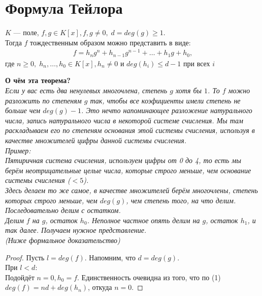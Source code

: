 \section{Формула Тейлора}

\begin{normalsize}

    \begin{theorem-non}
        $K$ --- поле, $f,g \in K[x], f,g \neq 0,\; d = deg(g) \geqslant 1.$ \\
        Тогда $f$ тождественным образом можно представить в виде:
        \begin{align}
            f = h_ng^n + h_{n-1}g^{n-1} + \dots + h_1g + h_0,
        \end{align}
        где $n \geqslant 0,\; h_n, \dots, h_0 \in K[x], h_n \neq 0$ и $deg(h_i) \leqslant d - 1$ при всех $i$
    \end{theorem-non}

    \textbf{О чём эта теорема?} \\
    \emph{Если у вас есть два ненулевых многочлена, степень $g$ хотя бы $1$. То $f$ можно разложить по степеням $g$ так,
    чтобы все коэфициенты имели степень не больше чем $deg(g) - 1$.
    Это нечто напоминающее разложение натурального числа, запись натурального числа в некоторой системе счисления. Мы там раскладываем
    его по степеням основания этой системы счисления, используя в качестве множителей цифры данной системы счисления.} \\
    \emph{Пример: \\
    Пятиричная система счисления, используем цифры от 0 до 4, то есть мы берём неотрицательные целые числа,
    которые строго меньше, чем основание системы счисления ($< 5$). \\
    }
    \emph{ Здесь делаем то же самое, в качестве множителей берём многочлены,
    степень которых строго меньше, чем $deg(g)$, чем степень того, на что делим.
    Последовательно делим с остатком. \\
    Делим  $f$ на $g$, остаток $h_0$.
    Неполное частное опять делим на $g$, остаток $h_1$, и так далее.
    Получаем нужное представление. \\
    (Ниже формальное доказательство)
    }

    \begin{proof}
        Пусть $l = deg(f)$. Напомним, что $d = deg(g)$. \\
        При $l < d$: \\
        Подойдёт $n = 0, h_0 = f$. Единственность очевидна из того, что по (1) $deg(f) = nd + deg(h_n)$, откуда $n=0$.
        

\end{proof}
\end{normalsize}
